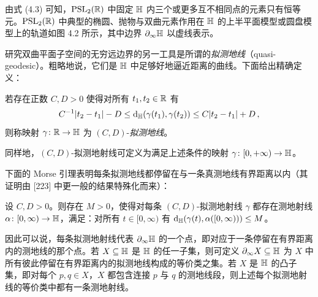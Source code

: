 
由式 (4.3) 可知，$\operatorname{PSL}_2(\mathbb{R})$ 中固定 $\mathbb{H}$ 内三个或更多互不相同点的元素只有恒等元。$\operatorname{PSL}_2(\mathbb{R})$ 中典型的椭圆、抛物与双曲元素作用在 $\mathbb{H}$ 的上半平面模型或圆盘模型上的轨道如图 4.2 所示，其中边界 $\partial_\infty\mathbb{H}$ 以虚线表示。


研究双曲平面子空间的无穷远边界的另一工具是所谓的\emph{拟测地线}（quasi-geodesic）。粗略地说，它们是 $\mathbb{H}$ 中足够好地逼近距离的曲线。下面给出精确定义：

\begin{definition}[4.2]
若存在正数 $C,D>0$ 使得对所有 $t_1,t_2\in\mathbb{R}$ 有
\[
C^{-1}|t_2-t_1|-D\le \mathrm{d}_{\mathbb{H}}(\gamma(t_1),\gamma(t_2))\le C|t_2-t_1|+D\,,
\]
则称映射 $\gamma\colon\mathbb{R}\to\mathbb{H}$ 为 $(C,D)$-\emph{拟测地线}。
\end{definition}

同样地，$(C,D)$-拟测地射线可定义为满足上述条件的映射 $\gamma\colon[0,+\infty)\to\mathbb{H}$。

下面的 Morse 引理表明每条拟测地线都停留在与一条真测地线有界距离以内（其证明由 [223] 中更一般的结果特殊化而来）：

\begin{lemma}[4.3]
设 $C,D>0$。则存在 $M>0$，使得对每条 $(C,D)$-拟测地射线 $\gamma$ 都存在测地射线 $\alpha\colon[0,\infty)\to\mathbb{H}$，满足：对所有 $t\in[0,\infty)$ 有 $\mathrm{d}_{\mathbb{H}}(\gamma(t),\alpha([0,\infty)))\le M$。
\end{lemma}

因此可以说，每条拟测地射线代表 $\partial_\infty\mathbb{H}$ 的一个点，即对应于一条停留在有界距离内的测地线的那个点。若 $X\subseteq\mathbb{H}$ 是 $\mathbb{H}$ 的任一子集，则可定义 $\partial_\infty X\subseteq\mathbb{H}$ 为 $X$ 中所有彼此停留在有界距离内的拟测地线构成的等价类之集。若 $X$ 是 $\mathbb{H}$ 的凸子集，即对每个 $p,q\in X$，$X$ 都包含连接 $p$ 与 $q$ 的测地线段，则上述每个拟测地射线的等价类中都有一条测地射线。

